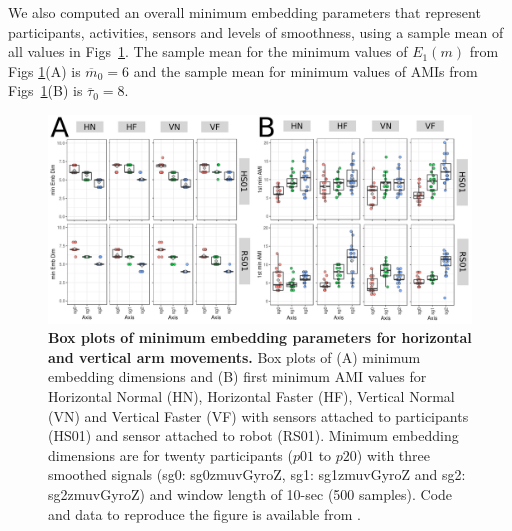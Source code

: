\documentclass[fleqn,10pt]{wlscirep}
\begin{document}
We also computed an overall minimum embedding parameters that represent 
participants, activities, sensors and levels of smoothness, using a sample 
mean of all values in Figs~\ref{fig:caoami}.
The sample mean for the minimum values of $E_{1}(m)$ from Figs \ref{fig:caoami}(A) 
is $\overline{m}_0=6$ 
and the sample mean for minimum values of AMIs from Figs~\ref{fig:caoami}(B)
is $\overline{\tau}_0=8$.
\begin{figure}[ht]
\centering
\includegraphics[width=1.0\textwidth]{figures/caoami/pdf/fig2}
	\caption{
	{\bf Box plots of minimum embedding parameters for horizontal and vertical arm movements.} 
	Box plots of (A) minimum embedding dimensions 
	and (B) first minimum AMI values for 
	Horizontal Normal (HN), Horizontal Faster (HF),
	Vertical Normal (VN) and Vertical Faster (VF)
	with sensors attached to participants (HS01) and
	sensor attached to robot (RS01).
	Minimum embedding dimensions are for twenty participants 
	($p01$ to $p20$) with three smoothed signals 
	(sg0: sg0zmuvGyroZ, sg1: sg1zmuvGyroZ and sg2: sg2zmuvGyroZ)
	and window length of 10-sec (500 samples).
	Code and data to reproduce the figure is available from \cite{srep2019}.
        }
    \label{fig:caoami}
\end{figure}
\end{document}
